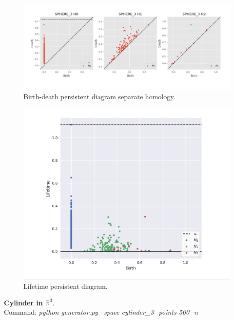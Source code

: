 \documentclass[11pt,a4paper]{report}
\begin{document}
              \begin{figure}[H]
                \centering
                \includegraphics[width=\linewidth]{./ripser/rand_sphere_homology_seperate.PNG}
                \caption{Birth-death persistent diagram separate homology.}
                \label{fig:sep hom}
              \end{figure}

              \begin{figure}[H]
                \centering
                \includegraphics[width=0.5\linewidth, scale=0.5]{./ripser/rand_sphere_lifetime.PNG}
                \caption{Lifetime persistent diagram.}
                \label{fig:sep hom}
              \end{figure}

              \textbf{Cylinder in $\mathbb{R}^3$}.\\
              Command: \textit{python generator.py --space cylinder\_3 -points 500 -n}
\end{document}
